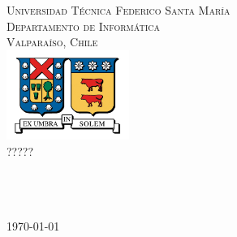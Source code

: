 \begin{titlepage}

\begin{center}

\textsc{\Large Universidad Técnica Federico Santa María}\\
\textsc{\large Departamento de Informática}\\
\textsc{\large Valparaíso, Chile}\\[1.5cm]

\includegraphics[width=0.3\textwidth]{figures/utfsm.jpg}\\[1cm]    

{ \huge ????? }\\[2cm]

\\[2cm]
\\[3cm]
\\

\vfill

{\large \today}

\end{center}

\end{titlepage}

